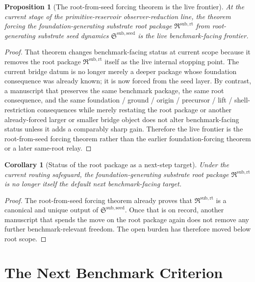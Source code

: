 \documentclass[11pt]{article}
\newcommand{\RootPackage}{\mathfrak R^{\mathrm{sub,rt}}}
\newcommand{\SeedPackage}{\mathfrak S^{\mathrm{sub,seed}}}
\newtheorem{proposition}{Proposition}
\newtheorem{corollary}{Corollary}
\begin{document}
\begin{proposition}[The root-from-seed forcing theorem is the live frontier]
At the current stage of the primitive-reservoir observer-reduction line, the theorem forcing the foundation-generating substrate root package \(\RootPackage\) from root-generating substrate seed dynamics \(\SeedPackage\) is the live benchmark-facing frontier.
\end{proposition}

\begin{proof}
That theorem changes benchmark-facing status at current scope because it removes the root package \(\RootPackage\) itself as the live internal stopping point. The current bridge datum is no longer merely a deeper package whose foundation consequence was already known; it is now forced from the seed layer. By contrast, a manuscript that preserves the same benchmark package, the same root consequence, and the same foundation / ground / origin / precursor / lift / shell-restriction consequences while merely restating the root package or another already-forced larger or smaller bridge object does not alter benchmark-facing status unless it adds a comparably sharp gain. Therefore the live frontier is the root-from-seed forcing theorem rather than the earlier foundation-forcing theorem or a later same-root relay.
\end{proof}

\begin{corollary}[Status of the root package as a next-step target]
Under the current routing safeguard, the foundation-generating substrate root package \(\RootPackage\) is no longer itself the default next benchmark-facing target.
\end{corollary}

\begin{proof}
The root-from-seed forcing theorem already proves that \(\RootPackage\) is a canonical and unique output of \(\SeedPackage\). Once that is on record, another manuscript that spends the move on the root package again does not remove any further benchmark-relevant freedom. The open burden has therefore moved below root scope.
\end{proof}

\section{The Next Benchmark Criterion}
\end{document}
